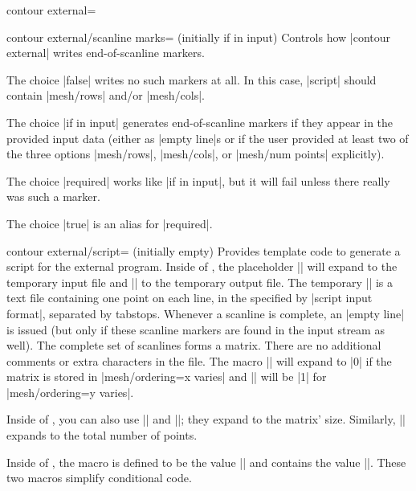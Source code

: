{{\begin{plottype}[/pgfplots]{
    contour external=\textcolor{black}{}%
}
    \begin{pgfplotskey}{contour external/scanline marks= (initially if in input)}
        Controls how |contour external| writes end-of-scanline markers.

        The choice |false| writes no such markers at all. In this case,
        |script| should contain |mesh/rows| and/or |mesh/cols|.

        The choice |if in input| generates end-of-scanline markers if they
        appear in the provided input data (either as |empty line|s or if the
        user provided at least two of the three options |mesh/rows|,
        |mesh/cols|, or |mesh/num points| explicitly).

        The choice |required| works like |if in input|, but it will fail unless
        there really was such a marker.

        The choice |true| is an alias for |required|.
    \end{pgfplotskey}

    \begin{pgfplotskey}{contour external/script= (initially empty)}
        Provides template code to generate a script for the external program.
        Inside of , the placeholder |\infile|
        will expand to the temporary input file and |\outfile| to the temporary
        output file. The temporary |\infile| is a text file containing one
        point on each line, in the specified by |script input format|, separated by tabstops.
        Whenever a scanline is complete, an |empty line| is issued (but only if
        these scanline markers are found in the input stream as well). The
        complete set of scanlines forms a matrix. There are no additional
        comments or extra characters in the file. The macro |\ordering| will
        expand to |0| if the matrix is stored in |mesh/ordering=x varies| and
        |\ordering| will be |1| for |mesh/ordering=y varies|.

        Inside of , you can also use
        || and
        ||; they expand to the matrix'
        size. Similarly, || expands
        to the total number of points.

        Inside of , the macro
        \declareandlabel{\thecontournumber} is defined to be the value
        || and
        \declareandlabel{\thecontourlevels} contains the value
        ||. These two macros simplify
        conditional code.


\end{pgfplotskey}
\end{plottype}}}
